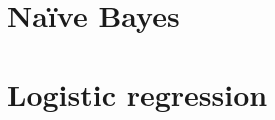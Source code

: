 \documentclass[14pt,mathserif]{beamer}
\begin{document}
\section{Na{\"i}ve Bayes}
\section{Logistic regression}
\end{document}
